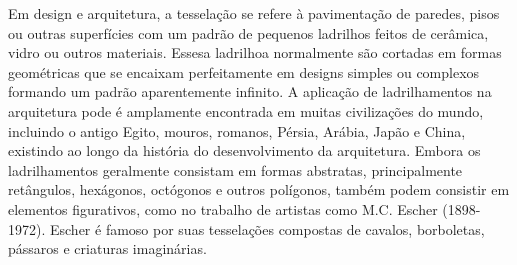 Em design e arquitetura, a tesselação se refere à pavimentação de paredes, pisos ou outras superfícies com um padrão de pequenos ladrilhos feitos de cerâmica, vidro ou outros materiais. Essesa ladrilhoa normalmente são cortadas em formas geométricas que se encaixam perfeitamente em designs simples ou complexos formando um padrão aparentemente infinito. A aplicação de ladrilhamentos  na arquitetura pode é  amplamente encontrada em muitas civilizações do mundo, incluindo o antigo Egito, mouros, romanos, Pérsia, Arábia, Japão e China, existindo ao longo da história do desenvolvimento da arquitetura. Embora os ladrilhamentos geralmente consistam em formas abstratas, principalmente retângulos, hexágonos, octógonos e outros polígonos, também podem consistir em elementos figurativos, como no trabalho de artistas como M.C. Escher (1898-1972). Escher é famoso por suas tesselações compostas de cavalos, borboletas, pássaros e criaturas imaginárias.


